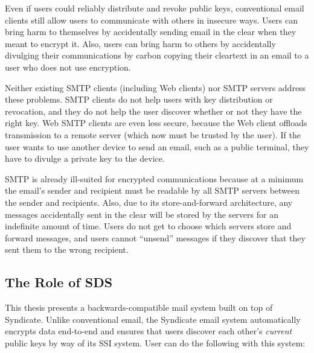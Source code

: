 Even if users could reliably distribute and revoke public keys, conventional
email clients still allow users to communicate with others in insecure ways.
Users can bring harm to themselves by accidentally sending email in the clear
when they meant to encrypt it.  Also, users can bring harm to others
by accidentally divulging their communications by carbon copying
their cleartext in an email to a user who does not use encryption.

Neither existing SMTP clients (including Web clients) nor
SMTP servers address these problems.  SMTP clients do not help users with key
distribution or revocation, and they do not help the user discover whether or
not they have the right key.  Web SMTP clients are even less secure, because the
Web client offloads transmission to a remote server (which now must be trusted
by the user).  If the user wants to use another device to send an email, such as
a public terminal, they have to divulge a private key to the device.

SMTP is already ill-suited for encrypted communications because at a minimum the email's
sender and recipient must be readable by all SMTP servers between the sender and
recipients.  Also, due to its store-and-forward architecture, any messages
accidentally sent in the clear will be stored by the servers for an
indefinite amount of time.  Users do not get to choose which servers store and forward
messages, and users cannot ``unsend'' messages if they discover that they sent
them to the wrong recipient.

\subsection{The Role of SDS}

This thesis presents a backwards-compatible mail system built on top of
Syndicate.  Unlike conventional email, the Syndicate email system
automatically encrypts data end-to-end and ensures that users
discover each other's \emph{current} public keys by way of its SSI
system.  User can do the following with this system:

